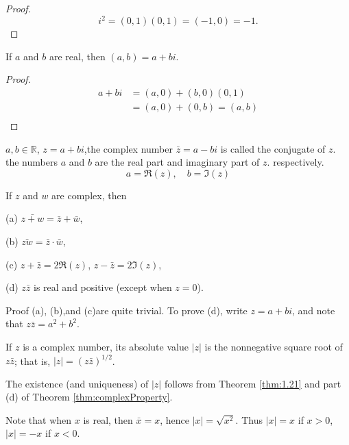 \begin{proof}
    \begin{equation*}
        i^2=(0,1)(0,1)=(-1,0)=-1.
    \end{equation*}
\end{proof}

\begin{thm}\label{thm:complexnumberTransfer}
    If $a$ and $b$ are real, then $(a,b) =a + bi$.
\end{thm}

\begin{proof}
    \begin{align*}
        a+bi
        &=(a,0)+(b,0)(0,1)\\
        &=(a,0)+(0,b)=(a,b)\\
    \end{align*}
\end{proof}

\begin{myDef}\label{myDef:conjugate}
    $a,b\in \mathbb{R}$, $z=a+bi$,the complex number $\bar{z}=a-bi$ is called the conjugate of $z$. the numbers $a$ and $b$ are the real part and imaginary part of $z$. respectively.
    \begin{equation*}
        a=\Re(z), \quad
        b=\Im(z)
    \end{equation*}
\end{myDef}

\begin{thm}\label{thm:complexProperty}
    If $z$ and $w$ are complex, then

    (a) $\bar{z+w}=\bar{z}+\bar{w}$,

    (b) $\bar{zw}=\bar{z}\cdot\bar{w}$,

    (c) $z+\bar{z}=2\Re(z)$, $z-\bar{z}=2\Im(z)$,

    (d) $z\bar{z}$ is real and positive (except when $z=0$).
\end{thm}
Proof (a), (b),and (c)are quite trivial. To prove (d), write $z = a + bi$,
and note that $z\bar{z} = a^2 + b^2$.

\begin{myDef}\label{myDef:complex_absolutevalue}
    If $z$ is a complex number, its absolute value $|z|$ is the nonnegative square root of $z\bar{z}$; that is, $|z| = (z\bar{z})^{1/2}$.
\end{myDef}
The existence (and uniqueness) of $|z|$ follows from Theorem \ref{thm:1.21} and
part (d) of Theorem \ref{thm:complexProperty}.

Note that when $x$ is real, then $\bar{x} = x$, hence $|x| = \sqrt{x^2}$. Thus $|x| = x$
if $x>0$, $|x| = -x$ if $x <0$.

